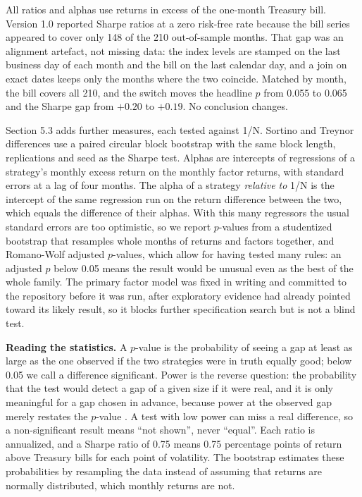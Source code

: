 \documentclass[12pt,letterpaper]{article}
\newenvironment{nuevotexto}{\par\color{nuevoc}}{\par}
\newcommand{\head}[1]{\noindent\textbf{#1}\hspace{0.5em}\ignorespaces}
\begin{document}
\begin{nuevotexto}
All ratios and alphas use returns in excess of the one-month Treasury bill. Version 1.0 reported
Sharpe ratios at a zero risk-free rate because the bill series appeared to cover only 148 of the
210 out-of-sample months. That gap was an alignment artefact, not missing data: the index levels
are stamped on the last business day of each month and the bill on the last calendar day, and a
join on exact dates keeps only the months where the two coincide. Matched by month, the bill
covers all 210, and the switch moves the headline $p$ from 0.055 to 0.065 and the Sharpe gap
from $+0.20$ to $+0.19$. No conclusion changes.

Section 5.3 adds further measures, each tested against 1/N. Sortino and Treynor differences use
a paired circular block bootstrap with the same block length, replications and seed as the
Sharpe test. Alphas are intercepts of regressions of a strategy's monthly excess return on the
monthly factor returns, with \citet{newey1987} standard errors at a lag of four months. The alpha
of a strategy \emph{relative to} 1/N is the intercept of the same regression run on the return
difference between the two, which equals the difference of their alphas. With this many
regressors the usual standard errors are too optimistic, so we report $p$-values from a studentized
bootstrap that resamples whole months of returns and factors together, and Romano-Wolf adjusted
$p$-values, which allow for having tested many rules: an adjusted $p$ below 0.05 means the result would
be unusual even as the best of the whole family. The primary factor model was fixed in writing and
committed to the repository before it was run, after exploratory evidence had already pointed
toward its likely result, so it blocks further specification search but is not a blind test.

\head{Reading the statistics.} A $p$-value is the probability of seeing a gap at least as large
as the one observed if the two strategies were in truth equally good; below 0.05 we call a
difference significant. Power is the reverse question: the probability that the test would
detect a gap of a given size if it were real, and it is only meaningful for a gap chosen in advance,
because power at the observed gap merely restates the $p$-value \citep{hoenig2001}. A test with low
power can miss a real difference, so a non-significant result means ``not shown'', never ``equal''.
Each ratio is annualized, and a Sharpe ratio of 0.75 means 0.75 percentage points of return above
Treasury bills for each point of volatility. The bootstrap estimates these
probabilities by resampling the data instead of assuming that returns are normally distributed,
which monthly returns are not.
\end{nuevotexto}
\end{document}
